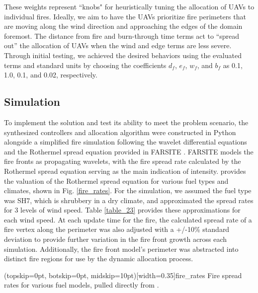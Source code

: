 \documentclass{ieeeaccess}
\begin{document}
These weights represent ``knobs" for heuristically tuning the allocation of UAVs to individual fires. Ideally, we aim to have the UAVs prioritize fire perimeters that are moving along the wind direction and approaching the edges of the domain foremost. The distance from fire and burn-through time terms act to ``spread out'' the allocation of UAVs when the wind and edge terms are less severe. Through initial testing, we achieved the desired behaviors using the evaluated terms and standard units by choosing the coefficients $d_f$, $e_f$, $w_f$, and $b_f$ as 0.1, 1.0, 0.1, and 0.02, respectively.

\subsection{Simulation}

To implement the solution and test its ability to meet the problem scenario, the synthesized controllers and allocation algorithm were constructed in Python alongside a simplified fire simulation following the wavelet differential equations and the Rothermel spread equation provided in FARSITE \cite{FARSITE}. FARSITE models the fire fronts as propagating wavelets, with the fire spread rate calculated by the Rothermel spread equation serving as the main indication of intensity. \cite{rosthermel} provides the valuation of the Rothermel spread equation for various fuel types and climates, shown in Fig. \ref{fire_rates}. For the simulation, we assumed the fuel type was SH7, which is shrubbery in a dry climate, and approximated the spread rates for 3 levels of wind speed. Table \ref{table_23} provides these approximations for each wind speed. At each update time for the fire, the calculated spread rate of a fire vertex along the perimeter was also adjusted with a +/-10\% standard deviation to provide further variation in the fire front growth across each simulation. Additionally, the fire front model's perimeter was abstracted into distinct fire regions for use by the dynamic allocation process. 

\Figure[t!](topskip=0pt, botskip=0pt, midskip=10pt)[width=0.35\textwidth]{fire_rates}
{Fire spread rates for various fuel models, pulled directly from \cite{rosthermel}.\label{fire_rates}}
\end{document}
